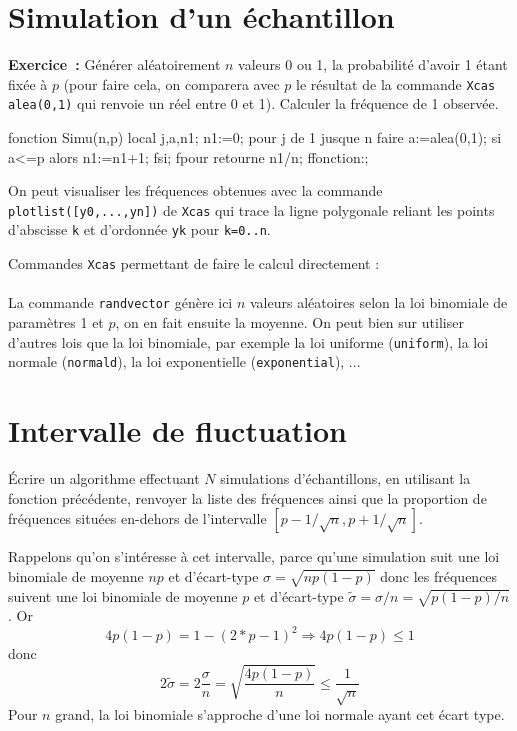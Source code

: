 \documentclass[12pt,a4paper]{book}
\begin{document}
\begin{giacjshere}
\section{Simulation d'un \'echantillon}\label{sec:Simu}
{\bf Exercice~:} G\'en\'erer al\'eatoirement $n$ valeurs 0 ou 1,
la probabilit\'e d'avoir 1 \'etant fix\'ee \`a $p$
(pour faire cela, on comparera avec $p$ le r\'esultat de la commande {\tt Xcas}
\verb|alea(0,1)| qui renvoie un r\'eel entre 0 et 1). 
Calculer la fr\'equence de 1 observ\'ee.
\begin{giaconload}
fonction Simu(n,p)
  local j,a,n1;
  n1:=0;
  pour j de 1 jusque n faire
    a:=alea(0,1);
    si a<=p alors n1:=n1+1; fsi;
  fpour
  retourne n1/n;
ffonction:;
\end{giaconload}
On peut visualiser les fr\'equences obtenues avec la commande 
{\tt plotlist([y0,...,yn])} de {\tt Xcas} qui trace la ligne polygonale reliant 
les points d'abscisse {\tt k} et d'ordonn\'ee {\tt yk} pour {\tt k=0..n}.\\

Commandes {\tt Xcas} permettant de faire le calcul directement :\\
\\
La commande \verb|randvector| g\'en\`ere ici $n$ valeurs al\'eatoires
selon la loi binomiale de param\`etres 1 et $p$, on en fait ensuite
la moyenne. On peut bien sur utiliser d'autres lois que la loi binomiale,
par exemple la loi uniforme (\verb|uniform|), la loi normale
(\verb|normald|), la loi exponentielle (\verb|exponential|), ...

\section{Intervalle de fluctuation}
\'Ecrire un algorithme effectuant $N$ simulations d'\'echantillons,
en utilisant la fonction pr\'ec\'edente, renvoyer la liste
des fr\'equences ainsi que la proportion
de fr\'equences situ\'ees en-dehors de l'intervalle 
$[p-1/\sqrt{n},p+1/\sqrt{n}]$.

Rappelons qu'on s'int\'eresse \`a cet intervalle, 
parce qu'une simulation suit une loi binomiale de moyenne $np$ et 
d'\'ecart-type $\sigma=\sqrt{n p (1-p)}$ donc 
les fr\'equences suivent une loi binomiale de moyenne $p$ et 
d'\'ecart-type $\tilde{\sigma}=\sigma/n=\sqrt{p (1-p)/n}$. Or
$$4p(1-p)=1-(2*p-1)^2 \Rightarrow 4p(1-p)\leq 1$$ 
donc
$$2\tilde{\sigma}=2\frac{\sigma}{n}=
\sqrt{\frac{4p(1-p)}{n}} \leq \frac{1}{\sqrt{n}}$$
Pour $n$ grand, la loi binomiale s'approche d'une loi normale
ayant cet \'ecart type.


\end{giacjshere}
\end{document}
